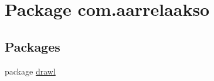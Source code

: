 \hypertarget{namespacecom_1_1aarrelaakso}{}\section{Package com.\+aarrelaakso}
\label{namespacecom_1_1aarrelaakso}
\subsection*{Packages}
\begin{DoxyCompactItemize}
\item 
package \hyperlink{namespacecom_1_1aarrelaakso_1_1drawl}{drawl}
\end{DoxyCompactItemize}

